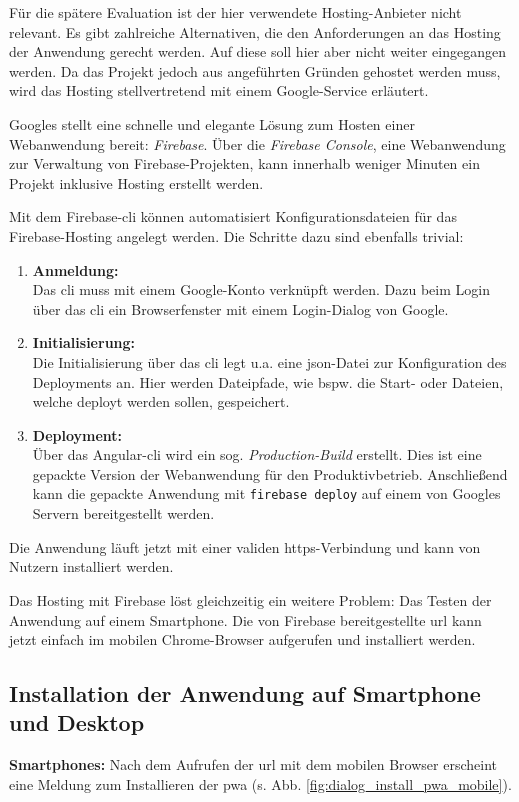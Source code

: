 Für die spätere Evaluation ist der hier verwendete Hosting-Anbieter nicht relevant. Es gibt zahlreiche Alternativen, die den Anforderungen an das Hosting der Anwendung gerecht werden. Auf diese soll hier aber nicht weiter eingegangen werden. Da das Projekt jedoch aus angeführten Gründen gehostet werden muss, wird das Hosting stellvertretend mit einem Google-Service erläutert.

Googles stellt eine schnelle und elegante Lösung zum Hosten einer Webanwendung bereit: \textit{Firebase}. Über die \textit{Firebase Console}, eine Webanwendung zur Verwaltung von Firebase-Projekten, kann innerhalb weniger Minuten ein Projekt inklusive Hosting erstellt werden. 

Mit dem Firebase-\ac{cli} können automatisiert Konfigurationsdateien für das Firebase-Hosting angelegt werden. Die Schritte dazu sind ebenfalls trivial:
\begin{enumerate}
	\item \textbf{Anmeldung: \\}
	      Das \ac{cli} muss mit einem Google-Konto verknüpft werden. Dazu beim Login über das \ac{cli} ein Browserfenster mit einem Login-Dialog von Google.
	\item \textbf{Initialisierung: \\}
	      Die Initialisierung über das \ac{cli} legt u.a. eine \ac{json}-Datei zur Konfiguration des Deployments an. Hier werden Dateipfade, wie bspw. die Start- oder Dateien, welche deployt werden sollen, gespeichert.
	\item \textbf{Deployment: \\}
	      Über das Angular-\ac{cli} wird ein sog. \textit{Production-Build} erstellt. Dies ist eine gepackte Version der Webanwendung für den Produktivbetrieb.
	      Anschließend kann die gepackte Anwendung mit \texttt{firebase deploy} auf einem von Googles Servern bereitgestellt werden.
\end{enumerate}

Die Anwendung läuft jetzt mit einer validen \ac{https}-Verbindung und kann von Nutzern installiert werden.

Das Hosting mit Firebase löst gleichzeitig ein weitere Problem: Das Testen der Anwendung auf einem Smartphone. Die von Firebase bereitgestellte \ac{url} kann jetzt einfach im mobilen Chrome-Browser aufgerufen und installiert werden.

\subsection{Installation der Anwendung auf Smartphone und Desktop}
\textbf{Smartphones:}
Nach dem Aufrufen der \ac{url} mit dem mobilen Browser erscheint eine Meldung zum Installieren der \ac{pwa} (s. Abb. \ref{fig:dialog_install_pwa_mobile}).

